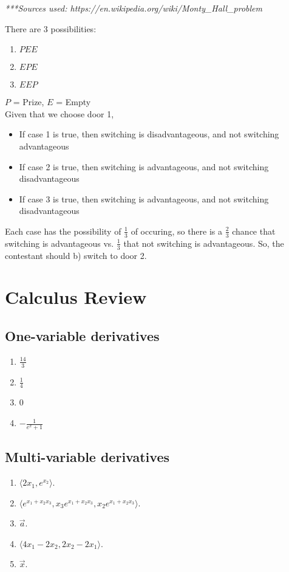 \documentclass{article}
\begin{document}
\textit{***Sources used: https://en.wikipedia.org/wiki/Monty\_Hall\_problem}

There are 3 possibilities:
\begin{enumerate}
	\item $PEE$
	\item $EPE$
	\item $EEP$\\
\end{enumerate}

\quad *$P$ = Prize, $E$ = Empty\\

Given that we choose door 1,
\begin{itemize}
	\item If case 1 is true, then switching is disadvantageous, and not switching advantageous
	\item If case 2 is true, then switching is advantageous, and not switching disadvantageous
	\item If case 3 is true, then switching is advantageous, and not switching disadvantageous
\end{itemize}

Each case has the possibility of $\frac{1}{3}$ of occuring, so there is a $\frac{2}{3}$ chance that switching is advantageous vs. $\frac{1}{3}$ that not switching is advantageous. So, the contestant should b) switch to door 2.

\section{Calculus Review}

\subsection{One-variable derivatives}

\begin{enumerate}
\item $\frac{14}{3}$
\item $\frac{1}{4}$
\item 0
\item $-\frac{1}{e^x+1}$
\end{enumerate}


\subsection{Multi-variable derivatives}

\begin{enumerate}
\item $\langle2x_1,e^{x_2}\rangle$.
\item $\langle e^{x_1+x_2x_3}, x_3e^{x_1+x_2x_3}, x_2e^{x_1+x_2x_3}\rangle$.
\item $\vec{a}$.
\item $\langle4x_1-2x_2, 2x_2-2x_1\rangle$.
\item $\vec{x}$.
\end{enumerate}
\end{document}
